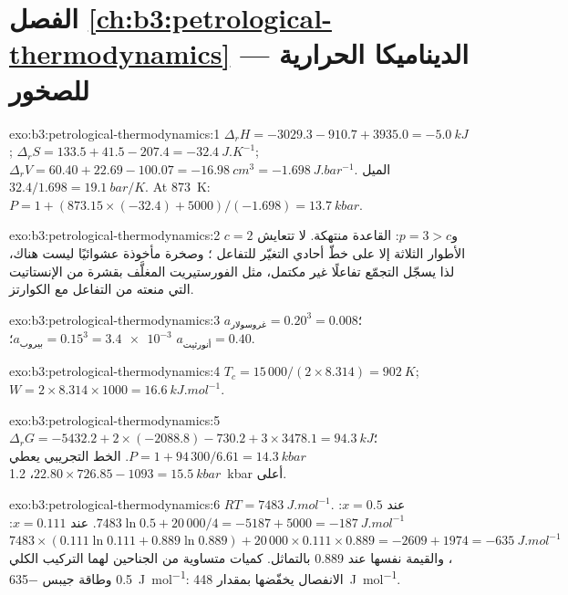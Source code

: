 \section*{الفصل \ref{ch:b3:petrological-thermodynamics} --- الديناميكا الحرارية للصخور}

\begin{solution}{exo:b3:petrological-thermodynamics:1}
$\Delta_rH = -3029.3 - 910.7 + 3935.0 = \qty{-5.0}{kJ}$; $\Delta_rS = 133.5 +
41.5 - 207.4 = \qty{-32.4}{J.K^{-1}}$; $\Delta_rV = 60.40 + 22.69 - 100.07 =
\qty{-16.98}{cm^3} = \qty{-1.698}{J.bar^{-1}}$. الميل $32.4/1.698 =
\qty{19.1}{bar/K}$. At \qty{873}{K}: $P = 1 + (873.15\times(-32.4) +
5000)/(-1.698) = \qty{13.7}{kbar}$.
\end{solution}

\begin{solution}{exo:b3:petrological-thermodynamics:2}
$c = 2$ و$p = 3 > c$: القاعدة منتهكة. لا تتعايش الأطوار الثلاثة إلا على
خطّ أحادي التغيّر للتفاعل ؛ وصخرة مأخوذة
عشوائيًا ليست هناك، لذا يسجّل التجمّع تفاعلًا غير مكتمل، مثل
الفورستيريت المغلَّف بقشرة من الإنستاتيت التي منعته من التفاعل مع
الكوارتز.
\end{solution}

\begin{solution}{exo:b3:petrological-thermodynamics:3}
$a_{\text{غروسولار}} = 0.20^3 = 0.008$؛ $a_{\text{بيروب}} = 0.15^3 =
\num{3.4e-3}$؛ $a_{\text{أنورثيت}} = 0.40$.
\end{solution}

\begin{solution}{exo:b3:petrological-thermodynamics:4}
$T_c = 15\,000/(2\times8.314) = \qty{902}{K}$; $W = 2\times8.314\times1000
= \qty{16.6}{kJ.mol^{-1}}$.
\end{solution}

\begin{solution}{exo:b3:petrological-thermodynamics:5}
$\Delta_rG = -5432.2 + 2\times(-2088.8) - 730.2 + 3\times3478.1 =
\qty{94.3}{kJ}$؛ $P = 1 + 94\,300/6.61 = \qty{14.3}{kbar}$. الخط التجريبي
يعطي $22.80\times726.85 - 1093 = \qty{15.5}{kbar}$، \qty{1.2}{kbar}
أعلى.
\end{solution}

\begin{solution}{exo:b3:petrological-thermodynamics:6}
$RT = \qty{7483}{J.mol^{-1}}$. عند $x = 0.5$: $7483\ln0.5 + 20\,000/4 = -5187 +
5000 = \qty{-187}{J.mol^{-1}}$. عند $x = 0.111$: $7483\times(0.111\ln0.111 +
0.889\ln0.889) + 20\,000\times0.111\times0.889 = -2609 + 1974 =
\qty{-635}{J.mol^{-1}}$، والقيمة نفسها عند 0.889 بالتماثل. كميات متساوية من
الجناحين لهما التركيب الكلي 0.5 وطاقة جيبس
\qty{-635}{J.mol^{-1}}: الانفصال يخفّضها بمقدار \qty{448}{J.mol^{-1}}.
\end{solution}

